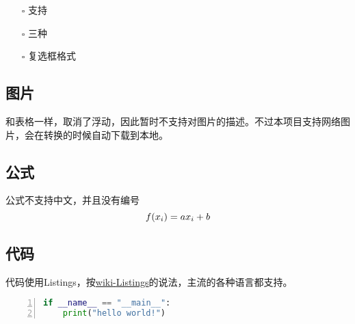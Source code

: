 \documentclass[UTF8]{ctexart}
\newenvironment{marktext}{}{}
\begin{document}
\begin{itemize}
\item[\rlap{\raisebox{0.3ex}{\hspace{0.4ex}\tiny \ding{52}}}$\square$]
支持
\item[\rlap{\raisebox{0.3ex}{\hspace{0.4ex}\scriptsize \ding{56}}}$\square$]
三种
\item[$\square$]
复选框格式
\end{itemize}
\begin{marktext}


\subsection{图片}


和表格一样，取消了浮动，因此暂时不支持对图片的描述。不过本项目支持网络图片，会在转换的时候自动下载到本地。




\subsection{公式}


公式不支持中文，并且没有编号
\end{marktext}
\[
\\ f(x_i)=ax_i+b\\ \\
\]
\begin{marktext}


\subsection{代码}


代码使用Listings，按\href{https://en.wikibooks.org/wiki/LaTeX/Source_Code_Listings}{wiki{-}Listings}的说法，主流的各种语言都支持。
\end{marktext}
\begin{lstlisting}[language={Python},keywordstyle=\color{blue!70},frame=shadowbox,showstringspaces=false,commentstyle=\color{red!50!green!50!blue!50},escapeinside=``,numbers=left,numberstyle=\small,basicstyle=\small]
if __name__ == "__main__":
	print("hello world!")
\end{lstlisting}
\end{document}
